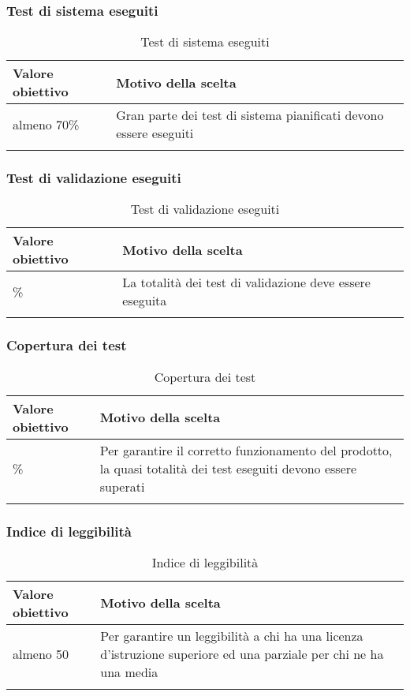 \documentclass[../PianoDiQualifica.tex]{subfiles}
\begin{document}
		\subsubsection{Test di sistema eseguiti}
			\begin{longtable}[c] { >{\centering\arraybackslash}p{4cm} p{7cm} }
				\toprule
				\centerline{\textbf{Valore obiettivo}} & \centerline{\textbf{Motivo della scelta}} \\
				\midrule
					almeno 70\% & Gran parte dei test di sistema pianificati devono essere eseguiti\\
				\bottomrule
				\caption{Test di sistema eseguiti}
			\end{longtable}
			
		\subsubsection{Test di validazione eseguiti}
			\begin{longtable}[c] { >{\centering\arraybackslash}p{4cm} p{7cm} }
				\toprule
				\centerline{\textbf{Valore obiettivo}} & \centerline{\textbf{Motivo della scelta}} \\
				\midrule
					100\% &	La totalità dei test di validazione deve essere eseguita \\
				\bottomrule
				\caption{Test di validazione eseguiti}
			\end{longtable}
			
		\subsubsection{Copertura dei test}
			\begin{longtable}[c] { >{\centering\arraybackslash}p{4cm} p{7cm} }
				\toprule
				\centerline{\textbf{Valore obiettivo}} & \centerline{\textbf{Motivo della scelta}} \\
				\midrule
					90\% & Per garantire il corretto funzionamento del prodotto, la quasi totalità dei test eseguiti devono essere superati \\
				\bottomrule
				\caption{Copertura dei test}
			\end{longtable}
			
		\subsubsection{Indice di leggibilità}
			\begin{longtable}[c] { >{\centering\arraybackslash}p{4cm} p{7cm} }
				\toprule
				\centerline{\textbf{Valore obiettivo}} & \centerline{\textbf{Motivo della scelta}} \\
				\midrule
					almeno 50 &	Per garantire un leggibilità a chi ha una licenza d'istruzione superiore ed una parziale per chi ne ha una media \\
				\bottomrule
				\caption{Indice di leggibilità}
			\end{longtable}
			
\end{document}
